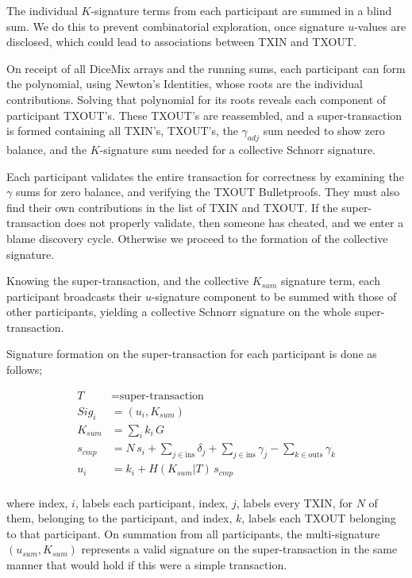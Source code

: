 \documentclass[a4paper, 10pt, conference]{ieeeconf}
\begin{document}
The individual $K$-signature terms from each participant are summed in a blind sum. We do this to prevent combinatorial exploration, once signature $u$-values are disclosed, which could lead to associations between TXIN and TXOUT.

On receipt of all DiceMix arrays and the running sums, each participant can form the polynomial, using Newton's Identities, whose roots are the individual contributions. Solving that polynomial for its roots reveals each component of participant TXOUT's. These TXOUT's are reassembled, and a super-transaction is formed containing all TXIN's, TXOUT's, the $\gamma_{\mathit{adj}}$ sum needed to show zero balance, and the $K$-signature sum needed for a collective Schnorr signature.

Each participant validates the entire transaction for correctness by examining the $\gamma$ sums for zero balance, and verifying the TXOUT Bulletproofs. They must also find their own contributions in the list of TXIN and TXOUT. If the super-transaction does not properly validate, then someone has cheated, and we enter a blame discovery cycle. Otherwise we proceed to the formation of the collective signature. 

Knowing the super-transaction, and the collective $K_{\mathit{sum}}$ signature term, each participant broadcasts their $u$-signature component to be summed with those of other participants, yielding a collective Schnorr signature on the whole super-transaction.

Signature formation on the super-transaction for each participant is done as follows;

\begin{align*}
T &= \text{super-transaction} \\
Sig_i &= (u_i, K_{sum}) \\
K_{sum} &= \sum_i{k_i \, G} \\
s_{cmp} &= N \, s_i + \sum_{j \in \text{ins}} {\delta_j} + \sum_{j \in \text{ins}} {\gamma_j} - \sum_{k \in \text{outs}} {\gamma_k} \\
u_i &= k_i + H(K_{sum} | T) \,  s_{cmp}\\
\end{align*}

where index, $i$, labels each participant, index, $j$, labels every TXIN, for $N$ of them, belonging to the participant, and index, $k$, labels each TXOUT belonging to that participant. On summation from all participants, the multi-signature $(u_{\mathit{sum}}, K_{\mathit{sum}})$ represents a valid signature on the super-transaction in the same manner that would hold if this were a simple transaction.
\end{document}
